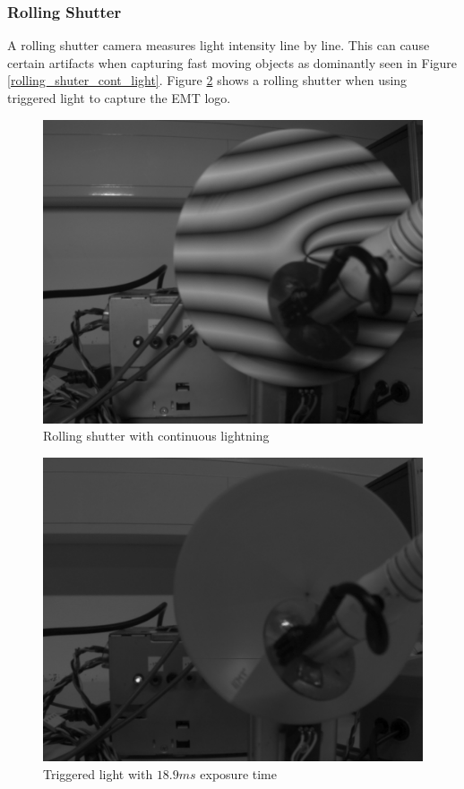 \documentclass[
a4paper,     %
12pt         %
]{scrartcl}  %
\begin{document}
\subsubsection{Rolling Shutter}

A rolling shutter camera measures light intensity line by line.
This can cause certain artifacts when capturing fast moving objects as dominantly seen in Figure \ref{rolling_shuter_cont_light}.
Figure \ref{fig:triggered_light_rolling_shutter} shows a rolling shutter when using triggered light to capture the EMT logo.

\begin{figure}[ht!]
 \centering
 \includegraphics[width=.8\linewidth]{./Bildg_Messtechnik_Lab/SensorDynamics/rolling_shuter_cont_light.png}
 \caption{Rolling shutter with continuous lightning}
 \label{fig:rolling_shuter_cont_light}
\end{figure}

\begin{figure}[ht!]
 \centering
 \includegraphics[width=.8\linewidth]{./Bildg_Messtechnik_Lab/SensorDynamics/triggered_light_rolling_shutter.png}
 \caption{Triggered light with $18.9ms$ exposure time}
 \label{fig:triggered_light_rolling_shutter}
\end{figure}
\end{document}
